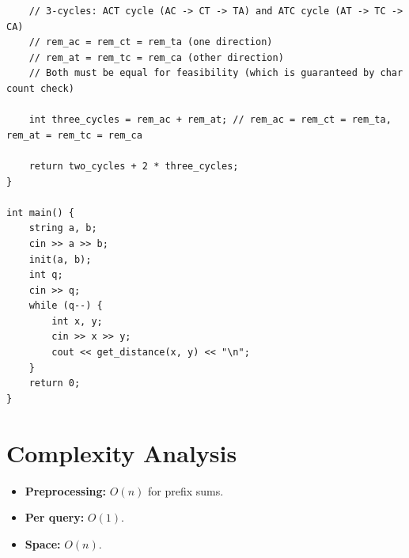 \documentclass[11pt,a4paper]{article}
\begin{document}
\begin{lstlisting}
    // 3-cycles: ACT cycle (AC -> CT -> TA) and ATC cycle (AT -> TC -> CA)
    // rem_ac = rem_ct = rem_ta (one direction)
    // rem_at = rem_tc = rem_ca (other direction)
    // Both must be equal for feasibility (which is guaranteed by char count check)

    int three_cycles = rem_ac + rem_at; // rem_ac = rem_ct = rem_ta, rem_at = rem_tc = rem_ca

    return two_cycles + 2 * three_cycles;
}

int main() {
    string a, b;
    cin >> a >> b;
    init(a, b);
    int q;
    cin >> q;
    while (q--) {
        int x, y;
        cin >> x >> y;
        cout << get_distance(x, y) << "\n";
    }
    return 0;
}
\end{lstlisting}

\section{Complexity Analysis}
\begin{itemize}
  \item \textbf{Preprocessing:} $O(n)$ for prefix sums.
  \item \textbf{Per query:} $O(1)$.
  \item \textbf{Space:} $O(n)$.
\end{itemize}
\end{document}
